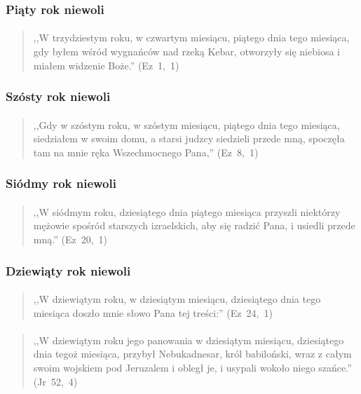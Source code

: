 \documentclass[10pt,a4paper,oneside]{article}
\begin{document}
\subsubsection{Piąty rok niewoli}
\paragraph{}
\begin{quote}
,,W trzydziestym roku, w czwartym miesiącu, piątego dnia tego miesiąca, gdy byłem wśród wygnańców nad rzeką Kebar, otworzyły się niebiosa i miałem widzenie Boże.'' \mbox{(Ez 1, 1)}
\end{quote}
\subsubsection{Szósty rok niewoli}
\paragraph{}
\begin{quote}
,,Gdy w szóstym roku, w szóstym miesiącu, piątego dnia tego miesiąca, siedziałem w swoim domu, a starsi judzcy siedzieli przede mną, spoczęła tam na mnie ręka Wszechmocnego Pana,'' \mbox{(Ez 8, 1)}
\end{quote}
\subsubsection{Siódmy rok niewoli}
\paragraph{}
\begin{quote}
,,W siódmym roku, dziesiątego dnia piątego miesiąca przyszli niektórzy mężowie spośród starszych izraelskich, aby się radzić Pana, i usiedli przede mną.'' \mbox{(Ez 20, 1)}
\end{quote}
\subsubsection{Dziewiąty rok niewoli}
\paragraph{}
\begin{quote}
,,W dziewiątym roku, w dziesiątym miesiącu, dziesiątego dnia tego miesiąca doszło mnie słowo Pana tej treści:'' \mbox{(Ez 24, 1)}
\end{quote}
\paragraph{}
\begin{quote}
,,W dziewiątym roku jego panowania w dziesiątym miesiącu, dziesiątego dnia tegoż miesiąca, przybył Nebukadnesar, król babiloński, wraz z całym swoim wojskiem pod Jeruzalem i obległ je, i usypali wokoło niego szańce.'' \mbox{(Jr 52, 4)}
\end{quote}
\end{document}
